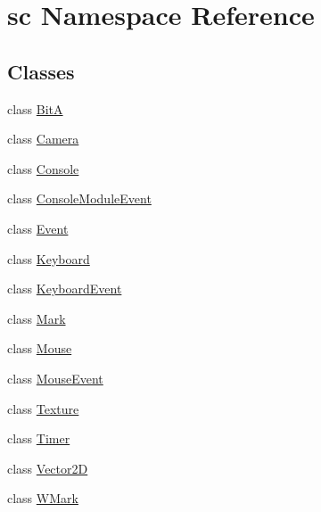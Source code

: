 \hypertarget{namespacesc}{}\section{sc Namespace Reference}
\label{namespacesc}
\subsection*{Classes}
\begin{DoxyCompactItemize}
\item 
class \mbox{\hyperlink{classsc_1_1_bit_a}{BitA}}
\item 
class \mbox{\hyperlink{classsc_1_1_camera}{Camera}}
\item 
class \mbox{\hyperlink{classsc_1_1_console}{Console}}
\item 
class \mbox{\hyperlink{classsc_1_1_console_module_event}{Console\+Module\+Event}}
\item 
class \mbox{\hyperlink{classsc_1_1_event}{Event}}
\item 
class \mbox{\hyperlink{classsc_1_1_keyboard}{Keyboard}}
\item 
class \mbox{\hyperlink{classsc_1_1_keyboard_event}{Keyboard\+Event}}
\item 
class \mbox{\hyperlink{classsc_1_1_mark}{Mark}}
\item 
class \mbox{\hyperlink{classsc_1_1_mouse}{Mouse}}
\item 
class \mbox{\hyperlink{classsc_1_1_mouse_event}{Mouse\+Event}}
\item 
class \mbox{\hyperlink{classsc_1_1_texture}{Texture}}
\item 
class \mbox{\hyperlink{classsc_1_1_timer}{Timer}}
\item 
class \mbox{\hyperlink{classsc_1_1_vector2_d}{Vector2D}}
\item 
class \mbox{\hyperlink{classsc_1_1_w_mark}{W\+Mark}}
\end{DoxyCompactItemize}
